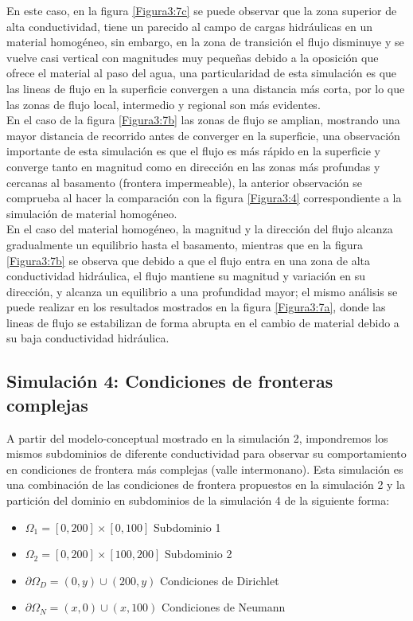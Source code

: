 En este caso, en la figura \ref{Figura3:7c} se puede observar que la zona superior de alta conductividad, tiene un parecido al campo de cargas hidráulicas en un material homogéneo, sin embargo, en la zona de transición el flujo disminuye y se vuelve casi vertical con magnitudes muy pequeñas debido a la oposición que ofrece el material al paso del agua, una particularidad de esta simulación es que las lineas de flujo en la superficie convergen a una distancia más corta, por lo que las zonas de flujo local, intermedio y regional son más evidentes.
\\

En el caso de la figura \ref{Figura3:7b} las zonas de flujo  se amplian, mostrando una mayor distancia de recorrido antes de converger en la superficie, una observación importante de esta simulación es que el flujo es más rápido en la superficie y converge tanto en magnitud como en dirección en las zonas más profundas y cercanas al basamento (frontera impermeable), la anterior observación se comprueba al hacer la comparación con la figura  \ref{Figura3:4} correspondiente a la simulación de material homogéneo. 
\\

En el caso del material homogéneo, la magnitud y la dirección del flujo alcanza gradualmente un equilibrio hasta el basamento, mientras que en la figura \ref{Figura3:7b} se observa que debido a que el flujo entra en una zona de alta conductividad hidráulica, el flujo mantiene su magnitud y variación en su dirección, y alcanza un equilibrio a una profundidad mayor; el mismo análisis se puede realizar en los resultados mostrados en la figura \ref{Figura3:7a}, donde las lineas de flujo se estabilizan de forma abrupta en el cambio de material debido a su baja conductividad hidráulica. 

\subsection{Simulación 4: Condiciones de fronteras complejas}

A partir del modelo-conceptual mostrado en la simulación 2, impondremos los mismos subdominios de diferente conductividad para observar su comportamiento en condiciones de frontera más complejas (valle intermonano). Esta simulación es una combinación de las condiciones de frontera propuestos en la simulación 2  y la partición del dominio en subdominios de la simulación 4 de la siguiente forma:

\begin{itemize}
\item  ${\Omega}_{1}=[0,200]{\times}[0,100]$ Subdominio 1
\item  ${\Omega}_{2}=[0,200]{\times}[100,200]$ Subdominio 2
\item  ${\partial}\Omega_{D}={(0,y){\cup}(200,y)}$ Condiciones de Dirichlet
\item  ${\partial}\Omega_{N}={(x,0){\cup}(x,100)}$ Condiciones de Neumann
\end{itemize}

